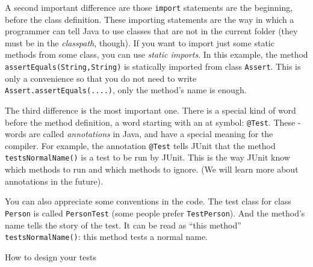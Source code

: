 A second important difference are those \verb+import+ statements are
the beginning, before the class definition. These importing statements
are the way in which a programmer can tell Java to use classes that
are not in the current folder (they must be in the \emph{classpath},
though). If you want to import just some static methods from some
class, you can use \emph{static imports}. In this example, the method
\verb+assertEquals(String,String)+ is statically imported from class
\verb+Assert+. This is only a convenience so that you do not need to
write \verb+Assert.assertEquals(....)+, only the method's name is
enough. 

The third difference is the most important one. There is a special
kind of word before the method definition, a word starting with an at
symbol: \verb+@Test+. These \@-words are called \emph{annotations} in
Java, and have a special meaning for the compiler. For example, the
annotation \verb+@Test+ tells JUnit that the method
\verb+testsNormalName()+ is a test to be run by JUnit. This is the way
JUnit know which methods to run and which methods to ignore. (We will
learn more about annotations in the future).

You can also appreciate some conventions in the code. The test class
for class \verb+Person+ is called \verb+PersonTest+ (some people
prefer \verb+TestPerson+). And the method's name tells the story of
the test. It can be read as ``this method'' \verb+testsNormalName()+:
this method tests a normal name.


How to design your tests


